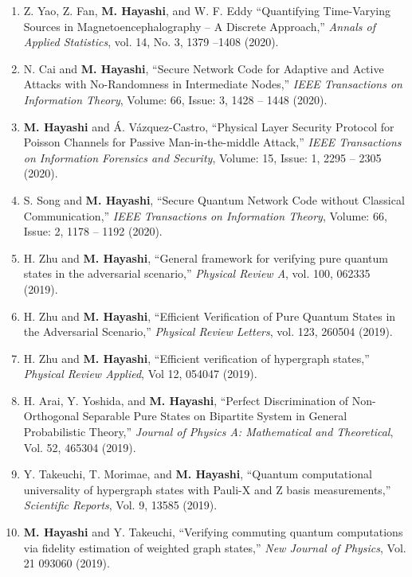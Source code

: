 \documentclass[a4paper,12pt,oneside]{article}
\begin{document}
\begin{enumerate}
\item  
Z. Yao, Z. Fan, \textbf{M. Hayashi}, and W. F. Eddy
``Quantifying Time-Varying Sources in Magnetoencephalography -- A Discrete Approach,''
{\em Annals of Applied Statistics},
vol. 14, No. 3, 1379 --1408 (2020).

\item  
N. Cai and \textbf{M. Hayashi},
``Secure Network Code for Adaptive and Active Attacks with No-Randomness in Intermediate Nodes,''
{\em IEEE Transactions on Information Theory}, Volume: 66, Issue: 3, 1428 -- 1448 (2020). 

\item  
\textbf{M. Hayashi} and \'{A}. V\'{a}zquez-Castro,
``Physical Layer Security Protocol for Poisson Channels 
for Passive Man-in-the-middle Attack,'' 
{\em IEEE Transactions on Information Forensics and Security},
Volume: 15, Issue: 1, 2295 -- 2305 (2020). 

\item  
S. Song and \textbf{M. Hayashi},
``Secure Quantum Network Code without Classical Communication,''
{\em IEEE Transactions on Information Theory}, 
Volume: 66, Issue: 2, 1178 -- 1192 (2020). 

\item 
H. Zhu and \textbf{M. Hayashi},
``General framework for verifying pure quantum states in the adversarial scenario,''
{\em Physical Review A}, 
vol. 100, 062335 (2019).
 
\item 
H. Zhu and \textbf{M. Hayashi},
``Efficient Verification of Pure Quantum States in the Adversarial Scenario,''
{\em Physical Review Letters}, 
vol. 123, 260504 (2019).

\item 
H. Zhu and \textbf{M. Hayashi},
``Efficient verification of hypergraph states,''
{\em Physical Review Applied}, 
Vol 12, 054047 (2019).

\item 
H. Arai, Y. Yoshida, and \textbf{M. Hayashi},
``Perfect Discrimination of Non-Orthogonal Separable Pure States on Bipartite System in General Probabilistic Theory,''
{\em Journal of Physics A: Mathematical and Theoretical}, 
Vol. 52, 465304 (2019).

\item 
Y. Takeuchi, T. Morimae, and \textbf{M. Hayashi},
``Quantum computational
universality of hypergraph states with Pauli-X and Z basis measurements,''
{\em Scientific Reports}, Vol. 9, 13585 (2019).

\item 
\textbf{M. Hayashi} and Y. Takeuchi, 
``Verifying commuting quantum computations via fidelity estimation of weighted graph states,''
{\em New Journal of Physics}, Vol. 21 093060 (2019).


\end{enumerate}
\end{document}
